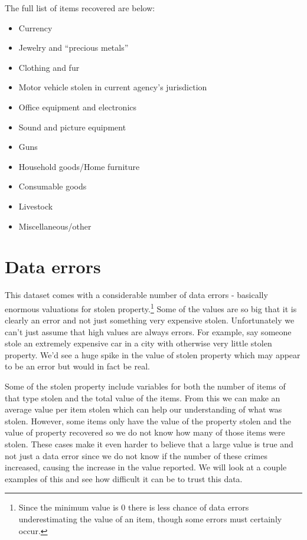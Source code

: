 \documentclass[
]{krantz}
\providecommand{\tightlist}{%
  \setlength{\itemsep}{0pt}\setlength{\parskip}{0pt}}
\begin{document}
The full list of items recovered are below:

\begin{itemize}
\tightlist
\item
  Currency
\item
  Jewelry and ``precious metals''
\item
  Clothing and fur
\item
  Motor vehicle stolen in current agency's jurisdiction
\item
  Office equipment and electronics
\item
  Sound and picture equipment
\item
  Guns
\item
  Household goods/Home furniture
\item
  Consumable goods
\item
  Livestock
\item
  Miscellaneous/other
\end{itemize}

\section{Data errors}\label{data-errors}

This dataset comes with a considerable number of data errors
- basically enormous valuations for stolen
property.\footnote{Since the minimum value is 0 there is
  less chance of data errors underestimating the value of an
  item, though some errors must certainly occur.} Some of
the values are so big that it is clearly an error and not
just something very expensive stolen. Unfortunately we can't
just assume that high values are always errors. For example,
say someone stole an extremely expensive car in a city with
otherwise very little stolen property. We'd see a huge spike
in the value of stolen property which may appear to be an
error but would in fact be real.

Some of the stolen property include variables for both the
number of items of that type stolen and the total value of
the items. From this we can make an average value per item
stolen which can help our understanding of what was stolen.
However, some items only have the value of the property
stolen and the value of property recovered so we do not know
how many of those items were stolen. These cases make it
even harder to believe that a large value is true and not
just a data error since we do not know if the number of
these crimes increased, causing the increase in the value
reported. We will look at a couple examples of this and see
how difficult it can be to trust this data.
\end{document}
